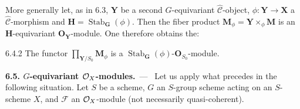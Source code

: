 More generally let, as in 6.3, \(\mathbf{Y}\) be a second \(G\)-equivariant
\(\widehat{\mathcal{C}}\)-object, \(\phi\colon\mathbf{Y}\to\mathbf{X}\) a
\(\widehat{\mathcal{C}}\)-morphism and
\(\mathbf{H}=\operatorname{Stab}_{\mathbf{G}}(\phi)\). Then the fiber product
\(\mathbf{M}_{\phi}=\mathbf{Y}\times_{\phi}\mathbf{M}\) is an
\(\mathbf{H}\)-equivariant \(\mathbf{O}_{\mathbf{Y}}\)-module. One therefore
obtains the:

\begin{corollary}{6.4.2}\label{I.6.4.2}
The functor \(\prod_{\mathbf{Y}/S_{0}}\mathbf{M}_{\phi}\) is a
\(\operatorname{Stab}_{\mathbf{G}}(\phi)\text{-}\mathbf{O}_{S_{0}}\)-module.
\end{corollary}

\par{}
\noindent\textbf{6.5. \(G\)-equivariant \(\mathcal{O}_X\)-modules.}\ ---\ \label{I.sec.6.5}
Let us apply what precedes in the following situation. Let \(S\) be a scheme,
\(G\) an \(S\)-group scheme acting on an \(S\)-scheme \(X\), and \(\mathcal{F}\)
an \(\mathcal{O}_X\)-module (not necessarily quasi-coherent).

